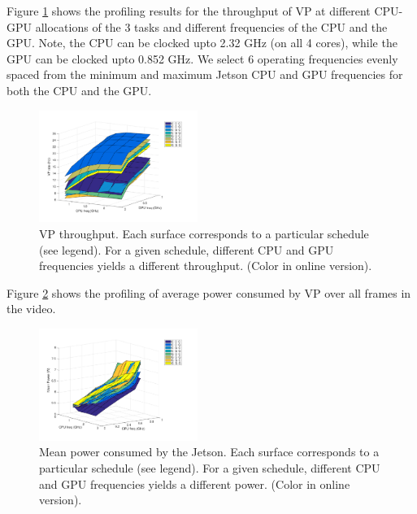 Figure \ref{fig:sfda} shows the profiling results for the throughput of 
VP at different CPU-GPU allocations of the 3 tasks and different frequencies of the CPU and the GPU. 
Note, the CPU can be clocked upto 2.32 GHz (on all 4 cores), while the GPU can be clocked upto 0.852 GHz. 
We select 6 operating frequencies evenly spaced from the minimum and maximum Jetson CPU and GPU frequencies for both the CPU and the GPU. 

\begin{figure}[htbp]
	\centering
	\includegraphics[width=0.46\textwidth]{Figs/surf_Rate.pdf}
	\caption{VP throughput. Each surface corresponds to a particular schedule (see legend). For a given schedule, different CPU and GPU frequencies yields a different throughput. (Color in online version).}
	\label{fig:sfda}%
\end{figure}


Figure \ref{fig:sfda_pow} shows the profiling of average power consumed by VP over all frames in the video.


\begin{figure}[htbp]
	\centering
	\includegraphics[width=0.46\textwidth]{Figs/surf_Power.pdf}
	\caption{Mean power consumed by the Jetson. Each surface corresponds to a particular schedule (see legend). For a given schedule, different CPU and GPU frequencies yields a different power. (Color in online version).}
	\label{fig:sfda_pow}%
\end{figure}

